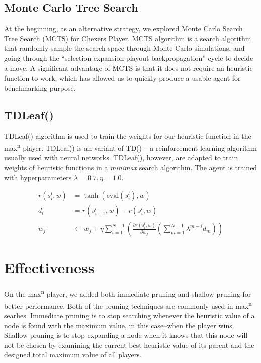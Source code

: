\documentclass[12pt,a4paper]{article}
\newcommand{\maxn}{max\textsuperscript{n}}
\newcommand{\TDLeaf}{TDLeaf(\textlambda)}
\begin{document}
\subsection{Monte Carlo Tree Search} \label{mcts}
At the beginning, as an alternative strategy, we explored Monte Carlo Search 
Tree Search (MCTS) for Chexers Player. MCTS algorithm \cite{Nijssen2013}
is a search algorithm that randomly sample the search space through Monte
Carlo simulations, and going through the 
``selection-expansion-playout-backpropagation'' cycle to decide a move.
A significant advantage of MCTS is that it does not require an heuristic 
function to work, which has allowed us to quickly produce a usable agent
for benchmarking purpose.

\subsection{\TDLeaf} \label{tdleaf}

\TDLeaf{} algorithm is used to train the weights for our heuristic function
in the \maxn{} player. \TDLeaf{} \cite{Baxter1999} is an variant of 
TD(\textlambda) -- a reinforcement learning algorithm usually used with 
neural networks. \TDLeaf{}, however, are adapted to train weights of 
heuristic functions in a \textit{minimax} search algorithm. The agent is 
trained with hyperparameters $\lambda = 0.7, \eta = 1.0$.

\begin{align}
    r(s_i^l, w) & = \tanh(\text{eval}(s_i^l), w)\\
    d_i & = r(s_{i+1}^l, w) - r(s_i^l, w) \\ 
    w_j & \leftarrow w_j + \eta \sum_{i=1}^{N-1} 
    \left(
        \frac{\partial r(s_i^l, w)}{\partial w_j}
        \left(
            \sum_{m=1}^{N-1} \lambda^{m-i} d_m
        \right)
    \right)
\end{align}

\section{Effectiveness}

\label{pruning}
On the \maxn{} player, we added both immediate pruning and shallow pruning
\cite{Sturtevant2000} for better performance. Both of the pruning techniques
are commonly used in \maxn{} searhes. Immediate pruning is to stop
searching whenever the heuristic value of a node is found with the maximum
value, in this case--when the player wins. Shallow pruning is to stop 
expanding a node when it knows that this node will not be chosen by examining
the current best heuristic value of its parent and the designed total maximum
value of all players.
\end{document}
